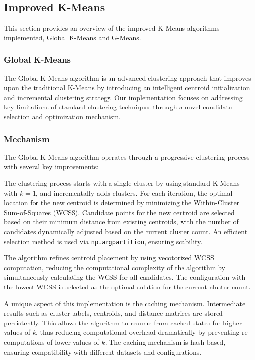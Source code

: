 \subsection{Improved K-Means}
\label{subsec:methods-improved-kmeans}

This section provides an overview of the improved K-Means algorithms implemented, Global K-Means and G-Means.

\subsubsection{Global K-Means}
\label{subsec:globalkmeansdiscussion}

The Global K-Means algorithm is an advanced clustering approach that improves upon the traditional K-Means by introducing an intelligent centroid initialization and incremental clustering strategy. \cite{global_kmeans}
Our implementation focuses on addressing key limitations of standard clustering techniques through a novel candidate selection and optimization mechanism.

\subsubsection*{Mechanism}
The Global K-Means algorithm operates through a progressive clustering process with several key improvements:

The clustering process starts with a single cluster by using standard K-Means with \(k=1\), and incrementally adds clusters.
For each iteration, the optimal location for the new centroid is determined by minimizing the Within-Cluster Sum-of-Squares (WCSS). \cite{global_kmeans}
Candidate points for the new centroid are selected based on their minimum distance from existing centroids, with the
number of candidates dynamically adjusted based on the current cluster count. An efficient selection method is
used via \texttt{np.argpartition}, ensuring scability.

The algorithm refines centroid placement by using vecotorized WCSS computation, reducing the computational
complexity of the algorithm by simultaneously calculating the WCSS for all candidates. The configuration with the lowest
WCSS is selected as the optimal solution for the current cluster count.

A unique aspect of this implementation is the caching mechanism. Intermediate results such as cluster labels, centroids, and
distance matrices are stored persistently. This allows the algorithm to resume from cached states for higher values of \(k\),
thus reducing computational overhead dramatically by preventing re-computations of lower values of \(k\).
The caching mechanism is hash-based, ensuring compatibility with different datasets and configurations.

